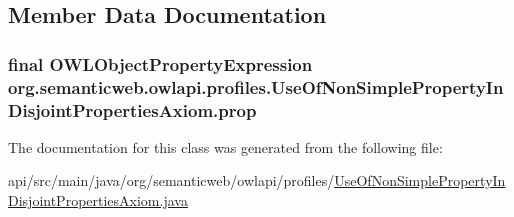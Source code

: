 \subsection{Member Data Documentation}
\hypertarget{classorg_1_1semanticweb_1_1owlapi_1_1profiles_1_1_use_of_non_simple_property_in_disjoint_properties_axiom_a30b93e16320f5315fe4f2798f25cb8bc}{
\subsubsection[{prop}]{\setlength{\rightskip}{0pt plus 5cm}final {\bf O\-W\-L\-Object\-Property\-Expression} org.\-semanticweb.\-owlapi.\-profiles.\-Use\-Of\-Non\-Simple\-Property\-In\-Disjoint\-Properties\-Axiom.\-prop\hspace{0.3cm}{\ttfamily [private]}}}\label{classorg_1_1semanticweb_1_1owlapi_1_1profiles_1_1_use_of_non_simple_property_in_disjoint_properties_axiom_a30b93e16320f5315fe4f2798f25cb8bc}


The documentation for this class was generated from the following file\-:\begin{DoxyCompactItemize}
\item 
api/src/main/java/org/semanticweb/owlapi/profiles/\hyperlink{_use_of_non_simple_property_in_disjoint_properties_axiom_8java}{Use\-Of\-Non\-Simple\-Property\-In\-Disjoint\-Properties\-Axiom.\-java}\end{DoxyCompactItemize}
